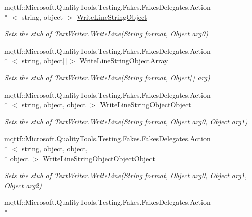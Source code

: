 \begin{DoxyCompactItemize}
mqttf\-::\-Microsoft.\-Quality\-Tools.\-Testing.\-Fakes.\-Fakes\-Delegates.\-Action\\*
$<$ string, object $>$ \hyperlink{class_system_1_1_i_o_1_1_fakes_1_1_stub_string_writer_a899d54a0c7e6428114160872065bcb67}{Write\-Line\-String\-Object}
\begin{DoxyCompactList}\small\item\em Sets the stub of Text\-Writer.\-Write\-Line(\-String format, Object arg0)\end{DoxyCompactList}\item 
mqttf\-::\-Microsoft.\-Quality\-Tools.\-Testing.\-Fakes.\-Fakes\-Delegates.\-Action\\*
$<$ string, object\mbox{[}$\,$\mbox{]}$>$ \hyperlink{class_system_1_1_i_o_1_1_fakes_1_1_stub_string_writer_a53b8b66446065b6402c43e749c616269}{Write\-Line\-String\-Object\-Array}
\begin{DoxyCompactList}\small\item\em Sets the stub of Text\-Writer.\-Write\-Line(\-String format, Object\mbox{[}$\,$\mbox{]} arg)\end{DoxyCompactList}\item 
mqttf\-::\-Microsoft.\-Quality\-Tools.\-Testing.\-Fakes.\-Fakes\-Delegates.\-Action\\*
$<$ string, object, object $>$ \hyperlink{class_system_1_1_i_o_1_1_fakes_1_1_stub_string_writer_a4797006ac16ff49c2215e0c9549d56b1}{Write\-Line\-String\-Object\-Object}
\begin{DoxyCompactList}\small\item\em Sets the stub of Text\-Writer.\-Write\-Line(\-String format, Object arg0, Object arg1)\end{DoxyCompactList}\item 
mqttf\-::\-Microsoft.\-Quality\-Tools.\-Testing.\-Fakes.\-Fakes\-Delegates.\-Action\\*
$<$ string, object, object, \\*
object $>$ \hyperlink{class_system_1_1_i_o_1_1_fakes_1_1_stub_string_writer_a90b306cf5a44d13af25176f5ec18dcc0}{Write\-Line\-String\-Object\-Object\-Object}
\begin{DoxyCompactList}\small\item\em Sets the stub of Text\-Writer.\-Write\-Line(\-String format, Object arg0, Object arg1, Object arg2)\end{DoxyCompactList}\item 
mqttf\-::\-Microsoft.\-Quality\-Tools.\-Testing.\-Fakes.\-Fakes\-Delegates.\-Action\\*

\end{DoxyCompactItemize}
